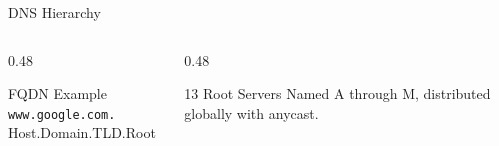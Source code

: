 \documentclass[aspectratio=169, 11pt]{beamer}
\begin{document}
\begin{frame}{DNS Hierarchy}
    \vspace{0.2em}
    \begin{columns}[T]
        \begin{column}{0.48\textwidth}
            \begin{block}{FQDN Example}
                \small
                \texttt{www.google.com.} \\
                \footnotesize
                Host.Domain.TLD.Root
            \end{block}
        \end{column}
        \begin{column}{0.48\textwidth}
            \begin{exampleblock}{13 Root Servers}
                \small
                Named A through M, distributed globally with anycast.
            \end{exampleblock}
        \end{column}
    \end{columns}
\end{frame}
\end{document}
